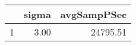 \begin{table}[h]
\centering
\begin{tabular}{rrr}
  \hline
 & sigma & avgSampPSec \\ 
  \hline
1 & 3.00 & 24795.51 \\ 
   \hline
\end{tabular}
\end{table}
